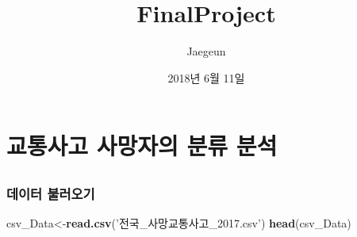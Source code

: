 \documentclass[]{article}
\title{FinalProject}
\author{Jaegeun}
\date{2018년 6월 11일}
\newenvironment{Shaded}{\begin{snugshade}}{\end{snugshade}}
\newcommand{\KeywordTok}[1]{\textcolor[rgb]{0.13,0.29,0.53}{\textbf{#1}}}
\newcommand{\StringTok}[1]{\textcolor[rgb]{0.31,0.60,0.02}{#1}}
\newcommand{\NormalTok}[1]{#1}
\begin{document}
\maketitle

\section{교통사고 사망자의 분류 분석}\label{---}

\subsection{}\label{section}

\subsubsection{데이터 불러오기}\label{-}

\begin{Shaded}
\begin{Highlighting}[]
\NormalTok{csv_Data<-}\KeywordTok{read.csv}\NormalTok{(}\StringTok{'전국_사망교통사고_2017.csv'}\NormalTok{) }
\KeywordTok{head}\NormalTok{(csv_Data)}
\end{Highlighting}
\end{Shaded}
\end{document}
